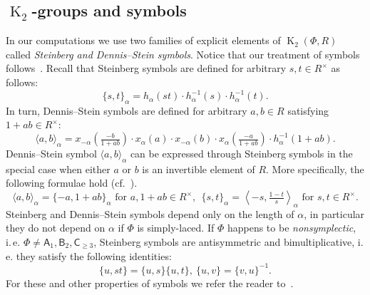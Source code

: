 \documentclass[oneside, 8pt]{amsart}
\theoremstyle{remark}
\theoremstyle{definition}
\DeclareMathOperator{\K}{K}
\newcommand{\rA}{\mathsf{A}}
\newcommand{\rB}{\mathsf{B}}
\newcommand{\rC}{\mathsf{C}}
\numberwithin{equation}{section}
\begin{document}
\subsection{$\K_2$-groups and symbols} In our computations we use two families of explicit elements of $\K_2(\Phi, R)$ called {\it Steinberg and Dennis--Stein symbols}. Notice that our treatment of symbols follows~\cite{DS73}. Recall that Steinberg symbols are defined for arbitrary $s, t \in R^\times$ as follows:
\begin{equation} \label{eq:steinberg} \{ s, t \}_\alpha = h_\alpha(st) \cdot h_\alpha^{-1}(s) \cdot h_\alpha^{-1}(t). \end{equation}
In turn, Dennis--Stein symbols are defined for arbitrary $a, b\in R$ satisfying $1 + ab \in R^\times$:
\begin{equation} \label{eq:dennis-stein}  \langle a,b \rangle _ \alpha = x_{-\alpha}\left(\tfrac{- b}{1 + ab}\right) \cdot x_{\alpha}(a) \cdot x_{-\alpha}(b) \cdot x_{\alpha}\left(\tfrac{- a}{1+ab}\right) \cdot h_{\alpha}^{-1}(1 + ab). \end{equation} 
Dennis--Stein symbol $\langle a, b \rangle_\alpha$ can be expressed through Steinberg symbols in the special case when either $a$ or $b$ is an invertible element of $R$. More specifically, the following formulae hold (cf.~\cite[p.~250]{DS73}).
\begin{equation} \label{DS-S-relationship} \langle a, b \rangle_\alpha = \{-a, 1+ab\}_\alpha\text{ for } a, 1+ab\in R^\times,\ \
 \{ s, t \}_\alpha = \left\langle -s, \tfrac{1 - t}{s} \right\rangle_\alpha\text{ for } s, t\in R^\times. \end{equation}
Steinberg and Dennis--Stein symbols depend only on the length of $\alpha$, in particular they do not depend on $\alpha$ if $\Phi$ is simply-laced. If $\Phi$ happens to be {\it nonsymplectic}, i.\,e. $\Phi \neq \rA_1, \rB_2, \rC_{\geq 3}$, Steinberg symbols are antisymmetric and bimultiplicative, i.\,e. they satisfy the following identities: \begin{equation} \label{eq:symbol-properties} \{ u, st \} = \{ u, s\} \{ u, t \}, \ \{ u, v \} = \{ v, u\}^{-1}. \end{equation}
For these and other properties of symbols we refer the reader to~\cite{DS73}.
\end{document}

